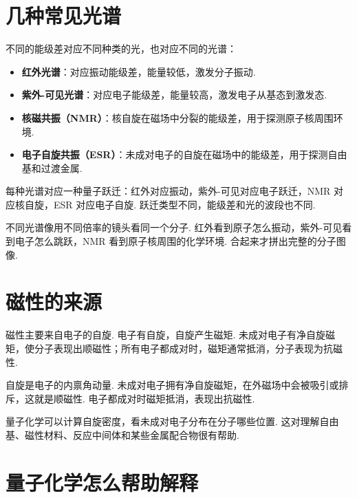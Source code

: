 \documentclass[UTF8,11pt,a4paper,openany]{ctexbook}
\begin{document}
\section{几种常见光谱}

不同的能级差对应不同种类的光，也对应不同的光谱：

\begin{itemize}
\item \textbf{红外光谱}：对应振动能级差，能量较低，激发分子振动. 
\item \textbf{紫外-可见光谱}：对应电子能级差，能量较高，激发电子从基态到激发态. 
\item \textbf{核磁共振（NMR）}：核自旋在磁场中分裂的能级差，用于探测原子核周围环境. 
\item \textbf{电子自旋共振（ESR）}：未成对电子的自旋在磁场中的能级差，用于探测自由基和过渡金属. 
\end{itemize}

\begin{notationbox}
每种光谱对应一种量子跃迁：红外对应振动，紫外-可见对应电子跃迁，NMR 对应核自旋，ESR 对应电子自旋. 跃迁类型不同，能级差和光的波段也不同. 
\end{notationbox}

\begin{analogybox}
不同光谱像用不同倍率的镜头看同一个分子. 红外看到原子怎么振动，紫外-可见看到电子怎么跳跃，NMR 看到原子核周围的化学环境. 合起来才拼出完整的分子图像. 
\end{analogybox}

\section{磁性的来源}

磁性主要来自电子的自旋. 电子有自旋，自旋产生磁矩. 未成对电子有净自旋磁矩，使分子表现出顺磁性；所有电子都成对时，磁矩通常抵消，分子表现为抗磁性. 

\begin{definitionbox}
自旋是电子的内禀角动量. 未成对电子拥有净自旋磁矩，在外磁场中会被吸引或排斥，这就是顺磁性. 电子都成对时磁矩抵消，表现出抗磁性. 
\end{definitionbox}

量子化学可以计算自旋密度，看未成对电子分布在分子哪些位置. 这对理解自由基、磁性材料、反应中间体和某些金属配合物很有帮助. 

\section{量子化学怎么帮助解释}
\end{document}
